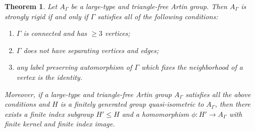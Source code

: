 \documentclass[11pt]{amsart}
\newtheorem{theorem}{Theorem}[section]
\theoremstyle{definition}
\begin{document}
\begin{theorem}
	\label{thm:largechar2}
Let $A_\Gamma$ be a large-type and triangle-free Artin group. Then $A_\Gamma$ is strongly rigid if and only if $\Gamma$ satisfies all of the following conditions:
\begin{enumerate}
	\item $\Gamma$ is connected and has $\ge 3$ vertices;
	\item $\Gamma$ does not have separating vertices and edges;
	\item any label preserving automorphism of $\Gamma$ which fixes the neighborhood of a vertex is the identity.
\end{enumerate}
Moreover, if a large-type and triangle-free Artin group $A_\Gamma$ satisfies all the above conditions and $H$ is a finitely generated group quasi-isometric to $A_\Gamma$, then there exists a finite index subgroup $H'\le H$ and a homomorphism $\phi\colon H'\to A_\Gamma$ with finite kernel and finite index image.
\end{theorem}
\end{document}

